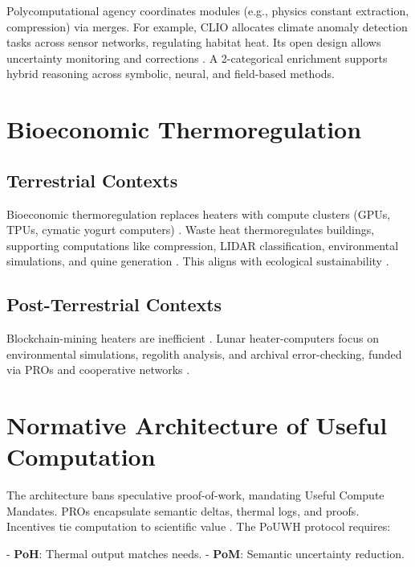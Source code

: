 \documentclass[12pt]{article}
\begin{document}
Polycomputational agency coordinates modules (e.g., physics constant extraction, compression) via merges. For example, CLIO allocates climate anomaly detection tasks across sensor networks, regulating habitat heat. Its open design allows uncertainty monitoring and corrections \citep{ChengBroadbentChappell2025}. A 2-categorical enrichment supports hybrid reasoning across symbolic, neural, and field-based methods.

\section{Bioeconomic Thermoregulation}
\label{sec:bioeconomic-thermoregulation}

\subsection{Terrestrial Contexts}

Bioeconomic thermoregulation replaces heaters with compute clusters (GPUs, TPUs, cymatic yogurt computers) \citep{Bennett1982, SagawaUeda2009}. Waste heat thermoregulates buildings, supporting computations like compression, LIDAR classification, environmental simulations, and quine generation \citep{Wolfram2002}. This aligns with ecological sustainability \citep{CapraLuisi2014, MargulisSagan1995}.

\subsection{Post-Terrestrial Contexts}

Blockchain-mining heaters are inefficient \citep{ODwyerMalone2014, Mora2018, DeVries2021}. Lunar heater-computers focus on environmental simulations, regolith analysis, and archival error-checking, funded via PROs and cooperative networks \citep{Carrier1991, Spudis2016, NASAArtemis2023}.

\section{Normative Architecture of Useful Computation}
\label{sec:normative-architecture}

The architecture bans speculative proof-of-work, mandating Useful Compute Mandates. PROs encapsulate semantic deltas, thermal logs, and proofs. Incentives tie computation to scientific value \citep{DalyFarley2011}. The PoUWH protocol requires:

- \textbf{PoH}: Thermal output matches needs.
- \textbf{PoM}: Semantic uncertainty reduction.
\end{document}
